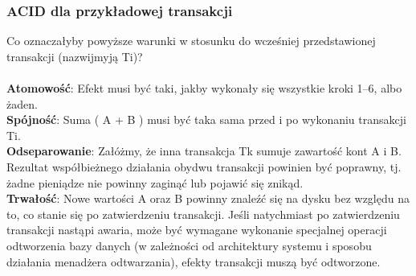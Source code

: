 \documentclass[main.tex]{subfiles}
\begin{document}
    \subsubsection{ACID dla przykładowej transakcji}
    Co oznaczałyby powyższe warunki w stosunku do wcześniej przedstawionej transakcji (nazwijmyją Ti)?
    \\\\
    \textbf{Atomowość}: Efekt musi być taki, jakby wykonały się wszystkie kroki 1--6, albo żaden.\\
    \textbf{Spójność}: Suma ( A + B ) musi być taka sama przed i po wykonaniu transakcji Ti.\\
    \textbf{Odseparowanie}: Załóżmy, że inna transakcja Tk sumuje zawartość kont A i B. Rezultat
    współbieżnego działania obydwu transakcji powinien być poprawny, tj. żadne
    pieniądze nie powinny zaginąć lub pojawić się znikąd.\\
    \textbf{Trwałość}: Nowe wartości A oraz B powinny znaleźć się na dysku bez względu na to, co
    stanie się po zatwierdzeniu transakcji. Jeśli natychmiast po zatwierdzeniu
    transakcji nastąpi awaria, może być wymagane wykonanie specjalnej operacji
    odtworzenia bazy danych (w zależności od architektury systemu i sposobu
    działania menadżera odtwarzania), efekty transakcji muszą być odtworzone.\\
\end{document}
